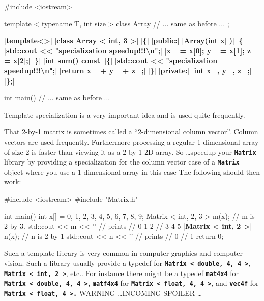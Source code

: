 \begin{consolethree}[escapeinside=||]
#include <iostream>

template < typename T, int size >
class Array
{     
     // ... same as before ...
};

|\textbf{template<>}|
|\textbf{class Array < int, 3 >}|
|\textbf{\{}|
|\textbf{public:}|
     |\textbf{Array(int x[])}|
     |\textbf{\{}|
          |\textbf{std::cout << "specialization speedup!!!\textbackslash n";}|
          |\textbf{x\_ = x[0]; y\_ = x[1]; z\_ = x[2];}|
     |\textbf{\}}|
     |\textbf{int sum() const}|    
     |\textbf{\{}|
          |\textbf{std::cout << "specialization speedup!!!\textbackslash n";}|
          |\textbf{return x\_ + y\_ + z\_;}|
     |\textbf{\}}|
|\textbf{private:}|
     |\textbf{int x\_, y\_, z\_;}|
|\textbf{\};}|

int main()
{   
     // ... same as before ...
} 
\end{consolethree}
Template specialization is a very important idea and is used quite
frequently.

That 2-by-1 matrix is sometimes called a ``2-dimensional column vector''. Column vectors are used frequently. Furthermore processing a regular 1-dimensional array of size 2 is faster than viewing it as a 2-by-1 2D array. So \ldots speedup your \texttt{\textbf{Matrix}} library by providing a specialization for the column vector case of a \texttt{\textbf{Matrix}} object where you use a 1-dimensional array in this case The following should then work:

\begin{consolethree}[escapeinside=||]
#include <iostream>
#include "Matrix.h"

int main()
{    
     int x[] = {0, 1, 2, 3, 4, 5, 6, 7, 8, 9};
     Matrix < int, 2, 3 > m(x); // m is 2-by-3.
     std::cout << m << '\n' // prints
                            // 0 1 2
                            // 3 4 5
     |\textbf{Matrix < int, 2 >}| n(x); // n is 2-by-1
     std::cout << n << '\n' // prints
                            // 0
                            // 1
     return 0;
} 
\end{consolethree}

Such a template library is very common in computer graphics and computer
vision. Such a library usually provide a typedef for \texttt{\textbf{Matrix < double, 4, 4 >}}, \texttt{\textbf{Matrix < int, 2 >}}, etc.. For instance there might be a typedef \texttt{\textbf{mat4x4}} for \texttt{\textbf{Matrix < double, 4, 4 >}}\textbf{, }\texttt{\textbf{mat}\textbf{f}\textbf{4x4}} for \textbf{\texttt{Matrix < float, 4, 4 >}}, and \texttt{\textbf{vec4f}} for \texttt{\textbf{Matrix < float, 4 >.}}
\newpage %
WARNING \ldots INCOMING SPOILER \ldots

